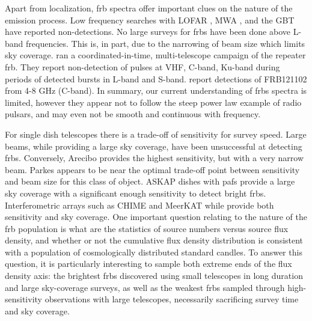 \documentclass[a4paper,fleqn,usenatbib]{mnras}
\begin{document}
Apart from localization, \gls{frb} spectra offer important clues on the nature
of the emission process. Low frequency searches with LOFAR
\citep{2015MNRAS.452.1254K}, MWA \citep{2015AJ....150..199T}, and the GBT
\citep{2017arXiv170107457C} have reported non-detections.  No large surveys for
\glspl{frb} have been done above L-band frequencies. This is, in part, due to
the narrowing of beam size which limits sky coverage.
\cite{2017arXiv170507553L} ran a coordinated-in-time, multi-telescope campaign
of the repeater \gls{frb}.  They report non-detection of pulses at VHF, C-band,
Ku-band during periods of detected bursts in L-band and S-band. \cite{atel10675}
report detections of FRB121102 from 4-8 GHz (C-band). In summary, our current
understanding of \glspl{frb} spectra is limited, however they appear not to
follow the steep power law example of radio pulsars, and may even not be smooth
and continuous with frequency.

For single dish telescopes there is a trade-off of sensitivity for survey speed.
Large beams, while providing a large sky coverage, have been unsuccessful at
detecting \glspl{frb}. Conversely, Arecibo provides the highest sensitivity, but
with a very narrow beam. Parkes appears to be near the optimal trade-off point
between sensitivity and beam size for this class of object. ASKAP dishes with
\glspl{paf} provide a large sky coverage with a significant enough sensitivity
to detect bright \glspl{frb}. Interferometric arrays such as CHIME and MeerKAT
while provide both sensitivity and sky coverage. One important question relating
to the nature of the \gls{frb} population is what are the statistics of source
numbers versus source flux density, and whether or not the cumulative flux
density distribution is consistent with a population of cosmologically
distributed standard candles. To answer this question, it is particularly
interesting to sample both extreme ends of the flux density axis: the brightest
\glspl{frb} discovered using small telescopes in long duration and large
sky-coverage surveys, as well as the weakest \glspl{frb} sampled through
high-sensitivity observations with large telescopes, necessarily sacrificing
survey time and sky coverage. 
\end{document}
